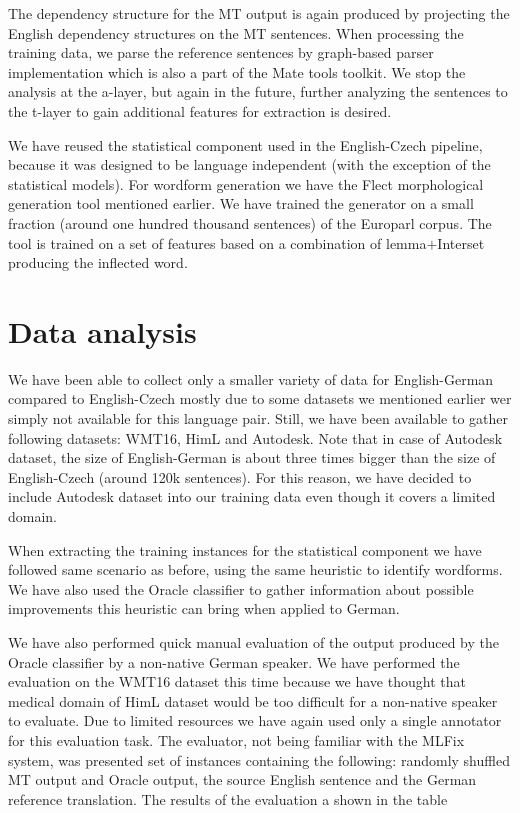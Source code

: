 The dependency structure for the MT output is again produced by projecting the English dependency
structures on the MT sentences. When processing the training data, we parse the reference sentences
by graph-based parser\cite{Bohnet:2010:VHA:1873781.1873792} implementation which is also a part of the
Mate tools toolkit. We stop the analysis at the a-layer, but again in the future, further analyzing
the sentences to the t-layer to gain additional features for extraction is desired.

We have reused the statistical component used in the English-Czech pipeline, because it was designed to be
language independent (with the exception of the statistical models). For wordform generation we have
the Flect morphological generation tool mentioned earlier. We have trained the generator on a small
fraction (around one hundred thousand sentences) of the Europarl corpus. The tool is trained on a set
of features based on a combination of lemma$+$Interset producing the inflected word.

\section{Data analysis}

We have been able to collect only a smaller variety of data for English-German compared to English-Czech
 mostly due to some datasets we mentioned earlier wer simply not available for this language pair. Still, we have been
available to gather following datasets: WMT16, HimL and Autodesk. Note that in case of Autodesk dataset,
the size of English-German is about three times bigger than the size of English-Czech (around 120k sentences).
For this reason, we have decided to include Autodesk dataset into our training data even though it covers
a limited domain.

When extracting the training instances for the statistical component we have followed same scenario
as before, using the same heuristic to identify  wordforms. We have also used the Oracle
classifier to gather information about possible improvements this heuristic can bring when applied to German.

We have also performed quick manual evaluation of the output produced by the Oracle classifier by a non-native
German speaker.
We have performed the evaluation on the WMT16 dataset this time because we have thought that medical domain of HimL dataset
would be too difficult for a non-native speaker to evaluate.
Due to limited
resources we have again used only a single annotator for this evaluation task. The evaluator, not being familiar
with the MLFix system, was presented set of instances containing the following: randomly shuffled MT output and Oracle output,
the source English sentence and the German reference translation. The results of the evaluation a shown in the table

